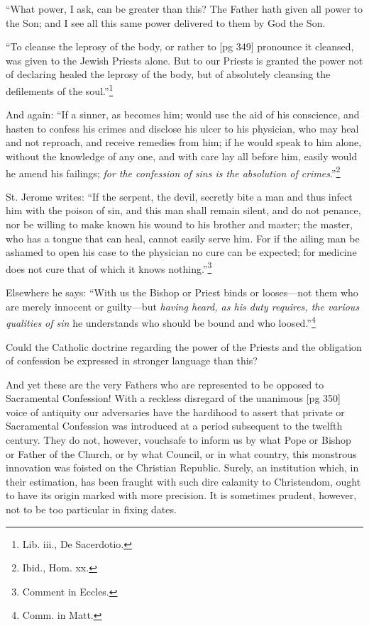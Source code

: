 “What power, I ask, can be greater than this?
The Father hath given all power to the Son; and I
see all this same power delivered to them by God
the Son.

“To cleanse the leprosy of the body, or rather to
[pg 349]
pronounce it cleansed, was given to the Jewish
Priests alone. But to our Priests is granted the
power not of declaring healed the leprosy of the
body, but of absolutely cleansing the defilements
of the soul.”\footnote{Lib. iii., De Sacerdotio.}

And again: “If a sinner, as becomes him; would
use the aid of his conscience, and hasten to confess
his crimes and disclose his ulcer to his physician,
who may heal and not reproach, and receive
remedies from him; if he would speak to him alone,
without the knowledge of any one, and with care
lay all before him, easily would he amend his
failings; \emph{for the confession of sins is the absolution
of crimes}.”\footnote{Ibid., Hom. xx.}

St. Jerome writes: “If the serpent, the devil,
secretly bite a man and thus infect him with the
poison of sin, and this man shall remain silent,
and do not penance, nor be willing to make known
his wound to his brother and master; the master,
who has a tongue that can heal, cannot easily serve
him. For if the ailing man be ashamed to open
his case to the physician no cure can be expected;
for medicine does not cure that of which it knows
nothing.”\footnote{Comment in Eccles.}

Elsewhere he says: “With us the Bishop or
Priest binds or looses—not them who are merely
innocent or guilty—but \emph{having heard, as his duty
requires, the various qualities of sin} he understands
who should be bound and who loosed.”\footnote{Comm. in Matt.}

Could the Catholic doctrine regarding the power
of the Priests and the obligation of confession be
expressed in stronger language than this?

And yet these are the very Fathers who are
represented to be opposed to Sacramental Confession!
With a reckless disregard of the unanimous
[pg 350]
voice of antiquity our adversaries have the hardihood
to assert that private or Sacramental Confession
was introduced at a period subsequent to
the twelfth century. They do not, however, vouchsafe
to inform us by what Pope or Bishop or
Father of the Church, or by what Council, or in
what country, this monstrous innovation was
foisted on the Christian Republic. Surely, an institution
which, in their estimation, has been
fraught with such dire calamity to Christendom,
ought to have its origin marked with more precision.
It is sometimes prudent, however, not to
be too particular in fixing dates.

